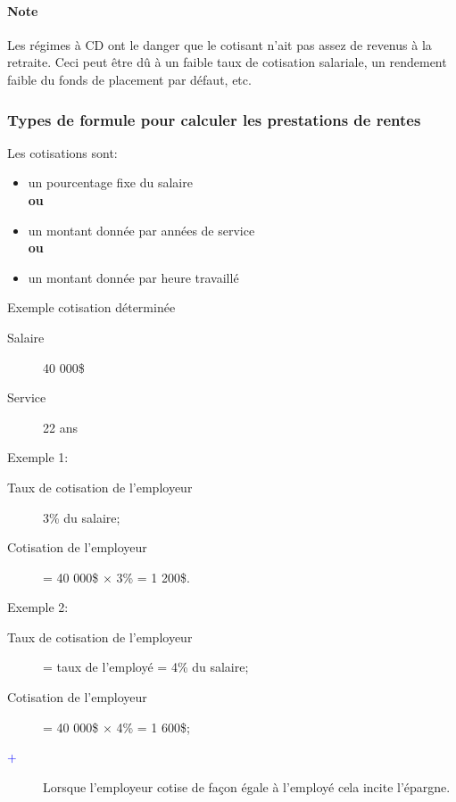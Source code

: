 \documentclass[10pt, french]{article}
\begin{document}
\begin{multicols*}{3}
\paragraph{Note}	Les régimes à CD ont le danger que le cotisant n'ait pas assez de revenus à la retraite. Ceci peut être dû à un faible taux de cotisation salariale, un rendement faible du fonds de placement par défaut, etc.

\subsubsection*{Types de formule pour calculer les prestations de rentes}

\begin{definitionNOHFILL}
Les cotisations sont: 
\begin{itemize}[leftmargin = *]
	\item	un pourcentage fixe du salaire \\
			\textbf{ou}
	\item	un montant donnée par années de service\\
			\textbf{ou}
	\item	un montant donnée par heure travaillé
\end{itemize}
\end{definitionNOHFILL}

\begin{conceptgen}{Exemple cotisation déterminée}
\begin{description}
	\item[Salaire]	40 000\$
	\item[Service]	22 ans
\end{description}
\tcbline
Exemple 1: 
\begin{description}
	\item[Taux de cotisation de l'employeur]	3\% du salaire;
	\item[Cotisation de l'employeur]	= 40 000\$ $\times$ 3\% = 1 200\$.
\end{description}	 
	
\tcbline

Exemple 2: 
\begin{description}
	\item[Taux de cotisation de l'employeur]	= taux de l'employé = 4\% du salaire;
	\item[Cotisation de l'employeur]	= 40 000\$ $\times$ 4\% = 1 600\$;
	\item[$\color{blue}+$]	Lorsque l'employeur cotise de façon égale à l'employé cela incite l'épargne.
\end{description}
	

\end{conceptgen}
\end{multicols*}
\end{document}
